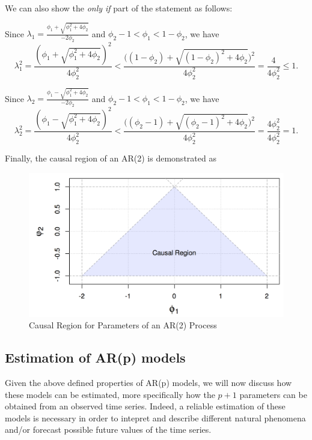 \documentclass[]{book}
\theoremstyle{definition}
\theoremstyle{definition}
\theoremstyle{definition}
\theoremstyle{remark}
\begin{document}
We can also show the \emph{only if} part of the statement as follows:

Since
\(\lambda_1 = \frac{\phi_1 + \sqrt{\phi_1^2 + 4\phi_2}}{-2\phi_2}\) and
\(\phi_2 - 1 < \phi_1 < 1- \phi_2\), we have \[
\lambda_1^2 = \frac{(\phi_1 + \sqrt{\phi_1^2 + 4\phi_2})^2}{4\phi_2^2} < \frac{\Big( (1-\phi_2)+ \sqrt{(1-\phi_2)^2 + 4\phi_2} \Big)^2}{4\phi_2^2} = \frac{4}{4\phi_2^2} \leq 1. 
\]

Since
\(\lambda_2 = \frac{\phi_1 - \sqrt{\phi_1^2 + 4\phi_2}}{-2\phi_2}\) and
\(\phi_2 - 1 < \phi_1 < 1- \phi_2\), we have \[
\lambda_2^2 = \frac{(\phi_1 - \sqrt{\phi_1^2 + 4\phi_2})^2}{4\phi_2^2} < \frac{\Big( (\phi_2-1)+ \sqrt{(\phi_2-1)^2 + 4\phi_2} \Big)^2}{4\phi_2^2} = \frac{4\phi_2^2}{4\phi_2^2} = 1. 
\]

Finally, the causal region of an AR(2) is demonstrated as

\begin{figure}

{\centering \includegraphics[width=22.97in]{images/causal_AR2} 

}

\caption{Causal Region for Parameters of an AR(2) Process}\label{fig:correxample2}
\end{figure}

\hypertarget{estimation-of-arp-models}{%
\subsection{Estimation of AR(p) models}\label{estimation-of-arp-models}}

Given the above defined properties of AR(p) models, we will now discuss
how these models can be estimated, more specifically how the \(p+1\)
parameters can be obtained from an observed time series. Indeed, a
reliable estimation of these models is necessary in order to intepret
and describe different natural phenomena and/or forecast possible future
values of the time series.
\end{document}
